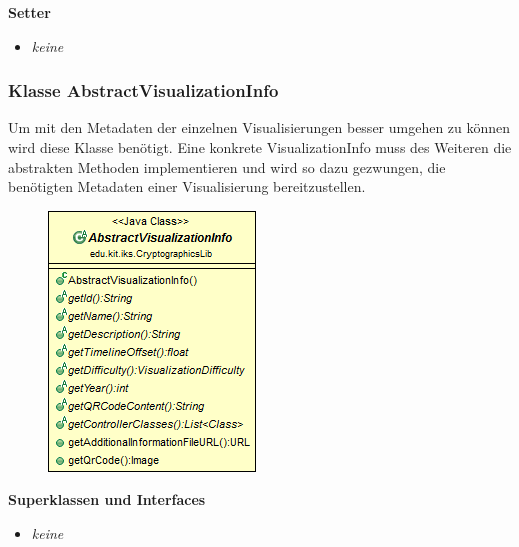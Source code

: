 \documentclass{article}
\begin{document}
      \textbf{Setter}
      \begin{itemize}
        \item \textit{keine}
      \end{itemize}
	
	\subsubsection{Klasse AbstractVisualizationInfo}
	  Um mit den Metadaten der einzelnen Visualisierungen besser umgehen zu können
	  wird diese Klasse benötigt. Eine konkrete VisualizationInfo muss des Weiteren
	  die abstrakten Methoden implementieren und wird so dazu gezwungen, die 
	  benötigten Metadaten einer Visualisierung bereitzustellen.
	
      \begin{figure}[H]
        \centering
        \includegraphics{resources/edu-kit-iks-CryptographicsLib-AbstractVisualizationInfo}
      \end{figure}
	
      \textbf{Superklassen und Interfaces}
      \begin{itemize}
        \item \textit{keine}
      \end{itemize}
	
\end{document}
